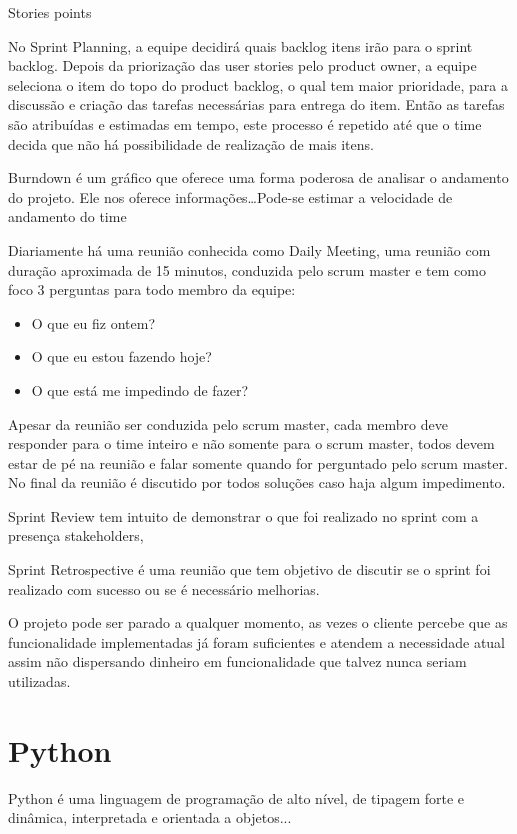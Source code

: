 \documentclass{abnt}
\begin{document}
		Stories points
		
		No Sprint Planning, a equipe decidirá quais backlog itens irão para o sprint backlog. Depois da priorização das user
		stories pelo product owner, a equipe seleciona o item do topo do product backlog, o qual tem maior prioridade, para a
		discussão e criação das tarefas necessárias para entrega do item. Então as tarefas são atribuídas e estimadas em
		tempo, este processo é repetido até que o time decida que não há possibilidade de realização de mais itens.
		
				
		Burndown é um gráfico que oferece uma forma poderosa de analisar o andamento do projeto. Ele nos oferece
		informações\ldots Pode-se estimar a velocidade de andamento do time
		
		Diariamente há uma reunião conhecida como Daily Meeting, uma reunião com duração aproximada de 15 minutos,
		conduzida pelo scrum master e tem como foco 3 perguntas para todo membro da equipe:
			\begin{itemize}
				\item O que eu fiz ontem?
				\item O que eu estou fazendo hoje?
				\item O que está me impedindo de fazer?
			\end{itemize}
		
		Apesar da reunião ser conduzida pelo scrum master, cada membro deve responder para o time inteiro e não somente para o
		scrum master, todos devem estar de pé na reunião e falar somente quando for perguntado pelo scrum master. No final da
		reunião é discutido por todos soluções caso haja algum impedimento.
		
		Sprint Review tem intuito de demonstrar o que foi realizado no sprint com a presença stakeholders, 
		
		Sprint Retrospective é uma reunião que tem objetivo de discutir se o sprint foi realizado com sucesso ou se é
		necessário melhorias.
		
		O projeto pode ser parado a qualquer momento, as vezes o cliente percebe que as funcionalidade implementadas já foram
		suficientes e atendem a necessidade atual assim não dispersando dinheiro em funcionalidade que talvez nunca seriam
		utilizadas.
	
	\section{Python}
	\blindtext
		Python é uma linguagem de programação de alto nível, de tipagem forte e dinâmica, interpretada e orientada a objetos...
		
\end{document}
